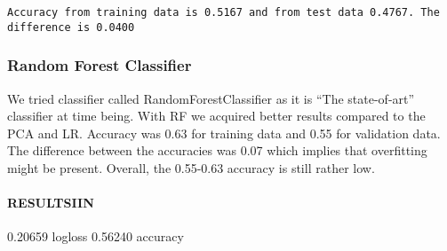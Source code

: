 \documentclass[11pt]{article}
\begin{document}
    \begin{Verbatim}[commandchars=\\\{\}]
Accuracy from training data is 0.5167 and from test data 0.4767. The difference is 0.0400

    \end{Verbatim}

    \hypertarget{random-forest-classifier}{%
\subsubsection{Random Forest
Classifier}\label{random-forest-classifier}}

We tried classifier called RandomForestClassifier as it is ``The
state-of-art'' classifier at time being. With RF we acquired better
results compared to the PCA and LR. Accuracy was 0.63 for training data
and 0.55 for validation data. The difference between the accuracies was
0.07 which implies that overfitting might be present. Overall, the
0.55-0.63 accuracy is still rather low.

\hypertarget{resultsiin}{%
\paragraph{RESULTSIIN}\label{resultsiin}}

0.20659 logloss 0.56240 accuracy
\end{document}
